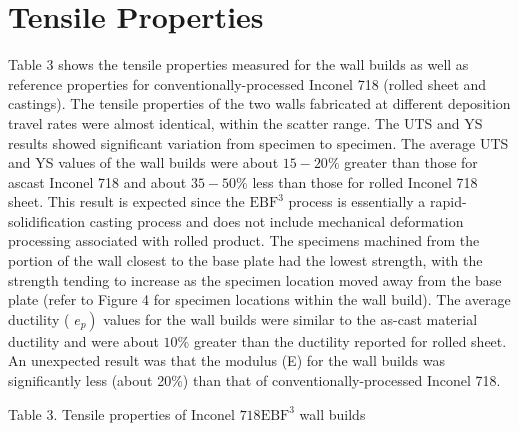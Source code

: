 \documentclass[10pt]{article}
\begin{document}
\section*{Tensile Properties}
Table 3 shows the tensile properties measured for the wall builds as well as reference properties for conventionally-processed Inconel 718 (rolled sheet and castings). The tensile properties of the two walls fabricated at different deposition travel rates were almost identical, within the scatter range. The UTS and YS results showed significant variation from specimen to specimen. The average UTS and YS values of the wall builds were about $15-20 \%$ greater than those for ascast Inconel 718 and about $35-50 \%$ less than those for rolled Inconel 718 sheet. This result is expected since the $\mathrm{EBF}^{3}$ process is essentially a rapid-solidification casting process and does not include mechanical deformation processing associated with rolled product. The specimens machined from the portion of the wall closest to the base plate had the lowest strength, with the strength tending to increase as the specimen location moved away from the base plate (refer to Figure 4 for specimen locations within the wall build). The average ductility ( $\left.e_{p}\right)$ values for the wall builds were similar to the as-cast material ductility and were about $10 \%$ greater than the ductility reported for rolled sheet. An unexpected result was that the modulus (E) for the wall builds was significantly less (about 20\%) than that of conventionally-processed Inconel 718.

Table 3. Tensile properties of Inconel $718 \mathrm{EBF}^{3}$ wall builds
\end{document}
